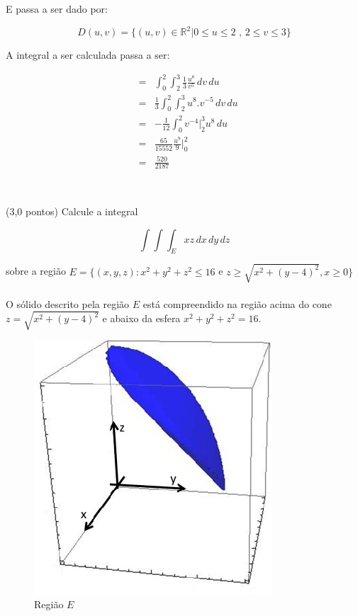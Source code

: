 \documentclass[12pt,a4paper]{article}
\newcommand{\re}{\mathbb{R}}
\begin{document}
\begin{itemize}
E passa a ser dado por:

$$D(u,v)=\{(u,v)\in \re^2|0\leq u \leq 2\,\,\mbox{,}\,\,2 \leq v \leq 3 \}$$

A integral a ser calculada passa a ser:

\begin{eqnarray*}
&=&\int_0^2\!\!\!\int_2^3 \frac{1}{3}\frac{u^8}{v^5}\,dv\,du\\
&=&\frac{1}{3} \int_0^2\!\!\!\int_2^3 u^8.v^{-5}\,dv\,du\\
&=& -\frac{1}{12}\int_0^2 v^{-4}\Big|_2^3 u^8\,du\\
&=& \frac{65}{15552}\frac{u^9}{9}\Big|_0^2\\
&=& \frac{520}{2187}
\end{eqnarray*}
    

\end{itemize}
\ \

\newpage

(3,0 pontos) Calcule a integral

$$ \int \int \int_E xz \,dx \,dy \,dz $$

sobre a região $ E = \{ (x,y,z): x^2 + y^2 + z^2 \leq 16 $ e $ z \geq \sqrt{ x^2 + (y-4)^2 }, x \geq 0 \} $ \\

 \\

O sólido descrito pela região $E$ está compreendido na região acima do cone $z = \sqrt{ x^2 + (y-4)^2 } $ e abaixo da esfera $ x^2 + y^2 + z^2 = 16 $.

\begin{figure}[h!]
	\centering
	\includegraphics[scale=0.5]{Q2A.jpg}  
	\caption{Região $E$}
	\label{fig:figura10}
\end{figure}
\end{document}
